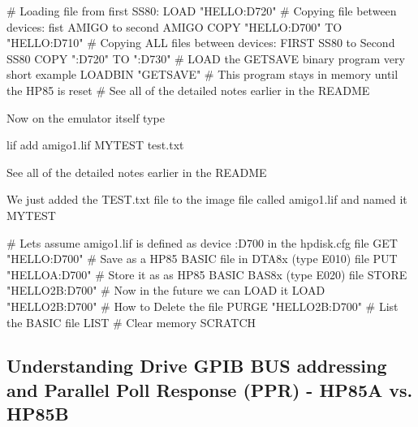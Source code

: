 \begin{DoxyPre}  \# Loading file from first SS80:
  LOAD "HELLO:D720"
  \# Copying file between devices: fist AMIGO to second AMIGO
  COPY "HELLO:D700" TO "HELLO:D710"
  \# Copying ALL files between devices: FIRST SS80 to Second SS80
  COPY ":D720" TO ":D730"
  \# LOAD the GETSAVE binary program very short example
  LOADBIN "GETSAVE"
  \# This program stays in memory until the HP85 is reset
  \# See all of the detailed notes earlier in the README 
\end{DoxyPre}

\begin{DoxyItemize}
\item Now on the emulator itself type
\item lif add amigo1.\+lif M\+Y\+T\+E\+ST test.\+txt
\begin{DoxyItemize}
\item See all of the detailed notes earlier in the R\+E\+A\+D\+ME
\end{DoxyItemize}
\item We just added the T\+E\+S\+T.\+txt file to the image file called amigo1.\+lif and named it M\+Y\+T\+E\+ST 
\begin{DoxyPre}
  \# Lets assume amigo1.lif is defined as device :D700 in the hpdisk.cfg file
  GET "HELLO:D700"
  \# Save as a HP85 BASIC file in DTA8x (type E010) file
  PUT "HELLOA:D700"
  \# Store it as as HP85 BASIC BAS8x (type E020) file
  STORE "HELLO2B:D700"
  \# Now in the future we can LOAD it 
  LOAD "HELLO2B:D700"
  \# How to Delete the file 
  PURGE "HELLO2B:D700"
  \# List the BASIC file
  LIST
  \# Clear memory
  SCRATCH
\end{DoxyPre}

\end{DoxyItemize}



 



\subsection*{Understanding Drive G\+P\+IB B\+US addressing and Parallel Poll Response (P\+PR) -\/ H\+P85A vs. H\+P85B}


